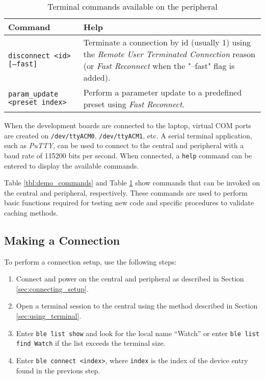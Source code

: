 \begin{table}[H]
    \centering
    \begin{tabular}{|l|p{6cm}|}
    \hline
    \textbf{Command}  & \textbf{Help} \\
    \hline 
    \texttt{disconnect <id> [--fast]} & Terminate a connection by id (usually 1) using the \textit{Remote User Terminated Connection} reason (or \textit{Fast Reconnect} when the "--fast" flag is added). \\ \hline
    \texttt{param\_update <preset index>} & Perform a parameter update to a predefined preset using \textit{Fast Reconnect}. \\ \hline
    \end{tabular}
    \caption{Terminal commands available on the peripheral}
    \label{tbl:demo_commands_peripheral}
\end{table}
When the development boards are connected to the laptop, virtual COM ports are created on \texttt{/dev/ttyACM0}, \texttt{/dev/ttyACM1}, etc. A serial terminal application, such as \textit{PuTTY}, can be used to connect to the central and peripheral with a baud rate of 115200 bits per second. When connected, a \texttt{help} command can be entered to display the available commands.

Table \ref{tbl:demo_commands} and Table \ref{tbl:demo_commands_peripheral} show commands that can be invoked on the central and peripheral, respectively. These commands are used to perform basic functions required for testing new code and specific procedures to validate caching methods.

\subsection{Making a Connection}
To perform a connection setup, use the following steps:
\begin{enumerate}
    \item Connect and power on the central and peripheral as described in Section \ref{sec:connecting_setup}.
    \item Open a terminal session to the central using the method described in Section \ref{sec:using_terminal}.
    \item Enter \texttt{ble list show} and look for the local name ``Watch'' or enter \texttt{ble list find Watch} if the list exceeds the terminal size.
    \item Enter \texttt{ble connect <index>}, where \texttt{index} is the index of the device entry found in the previous step.
\end{enumerate}


